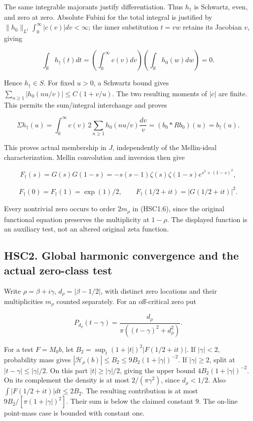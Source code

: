The same integrable majorants justify differentiation. Thus
\(h_\dagger\) is Schwartz, even, and zero at zero. Absolute Fubini for
the total integral is justified by
\(\|h_0\|_{L^1}\int_0^\infty|c(v)|dv<\infty\); the inner substitution
\(t=vw\) retains its Jacobian \(v\), giving

\[
 \int_{\mathbb R}h_\dagger(t)dt
 =\left(\int_0^\infty c(v)dv\right)
 \left(\int_{\mathbb R}h_0(w)dw\right)=0.
\]

Hence \(h_\dagger\in S\). For fixed \(u>0\), a Schwartz bound gives
\(\sum_{n\ge1}|h_0(nu/v)|\le C(1+v/u)\). The two resulting moments of
\(|c|\) are finite. This permits the sum/integral interchange and proves

\[
 \Sigma h_\dagger(u)
 =\int_0^\infty c(v)\,2\sum_{n\ge1}h_0(nu/v)\frac{dv}{v}
 =(b_0*Rb_0)(u)=b_\dagger(u).
\tag{HSC1.5}
\]

This proves actual membership in \(J\), independently of the
Mellin-ideal characterization. Mellin convolution and inversion then
give

\[
 F_\dagger(s)=G(s)G(1-s)
 =-s(s-1)\zeta(s)\zeta(1-s)e^{s^2+(1-s)^2},
\tag{HSC1.6}
\]

\[
 F_\dagger(0)=F_\dagger(1)=\exp(1)/2,\qquad
 F_\dagger(1/2+it)=|G(1/2+it)|^2.
\tag{HSC1.7}
\]

Every nontrivial zero occurs to order \(2m_\rho\) in (HSC1.6), since the
original functional equation preserves the multiplicity at \(1-\rho\).
The displayed function is an auxiliary test, not an altered original
zeta function.

\subsection{HSC2. Global harmonic convergence and the actual zero-class
test}\label{hsc2.-global-harmonic-convergence-and-the-actual-zero-class-test}

Write \(\rho=\beta+i\gamma\), \(d_\rho=|\beta-1/2|\), with distinct zero
locations and their multiplicities \(m_\rho\) counted separately. For an
off-critical zero put

\[
 P_{d_\rho}(t-\gamma)=\frac{d_\rho}{\pi((t-\gamma)^2+d_\rho^2)}.
\]

For a test \(F=M_0b\), let \(B_2=\sup_t(1+|t|)^2|F(1/2+it)|\). If
\(|\gamma|<2\), probability mass gives
\(|\mathcal H_\rho(b)|\le B_2\le9B_2(1+|\gamma|)^{-2}\). If
\(|\gamma|\ge2\), split at \(|t-\gamma|\le|\gamma|/2\). On this part
\(|t|\ge|\gamma|/2\), giving the upper bound \(4B_2(1+|\gamma|)^{-2}\).
On its complement the density is at most \(2/(\pi\gamma^2)\), since
\(d_\rho<1/2\). Also \(\int|F(1/2+it)|dt\le2B_2\). The resulting
contribution is at most \(9B_2/[\pi(1+|\gamma|)^2]\). Their sum is below
the claimed constant \(9\). The on-line point-mass case is bounded with
constant one.

